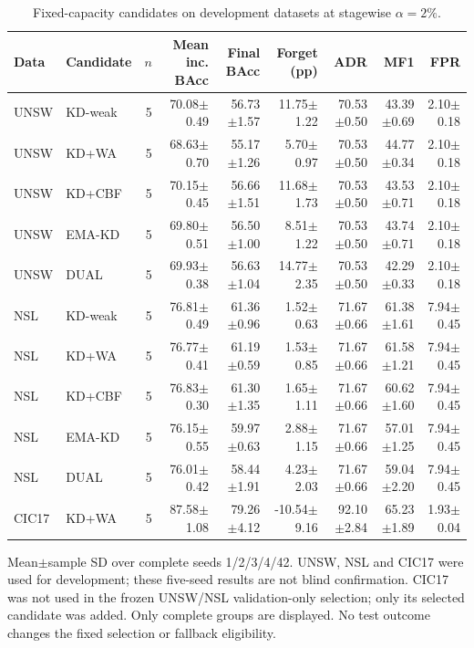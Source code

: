 \begin{table}[t]
\centering\scriptsize
\setlength{\tabcolsep}{3.8pt}
\caption{Fixed-capacity candidates on development datasets at stagewise $\alpha=2\%$.}\label{tab:compact-results}
\begin{tabular}{llrrrrrrr}
\toprule
Data & Candidate & $n$ & Mean inc. BAcc & Final BAcc & Forget (pp) & ADR & MF1 & FPR \\
\midrule
UNSW & KD-weak & 5 & 70.08$\pm$0.49 & 56.73$\pm$1.57 & 11.75$\pm$1.22 & 70.53$\pm$0.50 & 43.39$\pm$0.69 & 2.10$\pm$0.18 \\
UNSW & KD+WA & 5 & 68.63$\pm$0.70 & 55.17$\pm$1.26 & 5.70$\pm$0.97 & 70.53$\pm$0.50 & 44.77$\pm$0.34 & 2.10$\pm$0.18 \\
UNSW & KD+CBF & 5 & 70.15$\pm$0.45 & 56.66$\pm$1.51 & 11.68$\pm$1.73 & 70.53$\pm$0.50 & 43.53$\pm$0.71 & 2.10$\pm$0.18 \\
UNSW & EMA-KD & 5 & 69.80$\pm$0.51 & 56.50$\pm$1.00 & 8.51$\pm$1.22 & 70.53$\pm$0.50 & 43.74$\pm$0.71 & 2.10$\pm$0.18 \\
UNSW & DUAL & 5 & 69.93$\pm$0.38 & 56.63$\pm$1.04 & 14.77$\pm$2.35 & 70.53$\pm$0.50 & 42.29$\pm$0.33 & 2.10$\pm$0.18 \\
NSL & KD-weak & 5 & 76.81$\pm$0.49 & 61.36$\pm$0.96 & 1.52$\pm$0.63 & 71.67$\pm$0.66 & 61.38$\pm$1.61 & 7.94$\pm$0.45 \\
NSL & KD+WA & 5 & 76.77$\pm$0.41 & 61.19$\pm$0.59 & 1.53$\pm$0.85 & 71.67$\pm$0.66 & 61.58$\pm$1.21 & 7.94$\pm$0.45 \\
NSL & KD+CBF & 5 & 76.83$\pm$0.30 & 61.30$\pm$1.35 & 1.65$\pm$1.11 & 71.67$\pm$0.66 & 60.62$\pm$1.60 & 7.94$\pm$0.45 \\
NSL & EMA-KD & 5 & 76.15$\pm$0.55 & 59.97$\pm$0.63 & 2.88$\pm$1.15 & 71.67$\pm$0.66 & 57.01$\pm$1.25 & 7.94$\pm$0.45 \\
NSL & DUAL & 5 & 76.01$\pm$0.42 & 58.44$\pm$1.91 & 4.23$\pm$2.03 & 71.67$\pm$0.66 & 59.04$\pm$2.20 & 7.94$\pm$0.45 \\
CIC17 & KD+WA & 5 & 87.58$\pm$1.08 & 79.26$\pm$4.12 & -10.54$\pm$9.16 & 92.10$\pm$2.84 & 65.23$\pm$1.89 & 1.93$\pm$0.04 \\
\bottomrule
\end{tabular}
\par\vspace{2pt}\begin{minipage}{.98\linewidth}\footnotesize Mean$\pm$sample SD over complete seeds 1/2/3/4/42. UNSW, NSL and CIC17 were used for development; these five-seed results are not blind confirmation. CIC17 was not used in the frozen UNSW/NSL validation-only selection; only its selected candidate was added. Only complete groups are displayed. No test outcome changes the fixed selection or fallback eligibility.\end{minipage}
\end{table}

